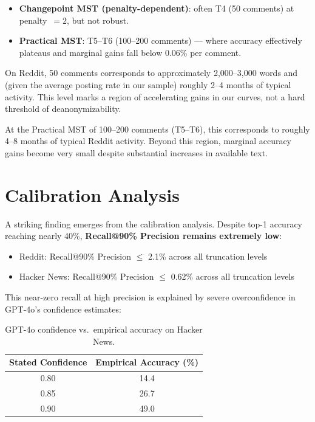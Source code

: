 \documentclass[sigplan,screen,nonacm]{acmart}
\begin{document}
\begin{itemize}
  \item \textbf{Changepoint MST (penalty-dependent)}: often T4 (50 comments) at
        penalty~$= 2$, but not robust.
  \item \textbf{Practical MST}: T5--T6 (100--200 comments) --- where accuracy
        effectively plateaus and marginal gains fall below 0.06\% per comment.
\end{itemize}

On Reddit, 50 comments corresponds to approximately 2{,}000--3{,}000 words and
(given the average posting rate in our sample) roughly 2--4 months of typical
activity. This level marks a region of accelerating gains in our curves, not a
hard threshold of deanonymizability.

At the Practical MST of 100--200 comments (T5--T6), this corresponds to roughly
4--8 months of typical Reddit activity. Beyond this region, marginal accuracy
gains become very small despite substantial increases in available text.


\section{Calibration Analysis}


A striking finding emerges from the calibration analysis. Despite top-1 accuracy
reaching nearly 40\%, \textbf{Recall@90\% Precision remains extremely low}:

\begin{itemize}
  \item Reddit: Recall@90\% Precision $\leq$ 2.1\% across all truncation levels
  \item Hacker News: Recall@90\% Precision $\leq$ 0.62\% across all truncation levels
\end{itemize}

This near-zero recall at high precision is explained by severe overconfidence in
GPT-4o's confidence estimates:

\begin{table}[H]
\centering
\caption{GPT-4o confidence vs.\ empirical accuracy on Hacker News.}
\begin{tabular}{cc}
\toprule
Stated Confidence & Empirical Accuracy (\%) \\
\midrule
0.80 & 14.4 \\
0.85 & 26.7 \\
0.90 & 49.0 \\
\bottomrule
\end{tabular}
\end{table}
\end{document}
